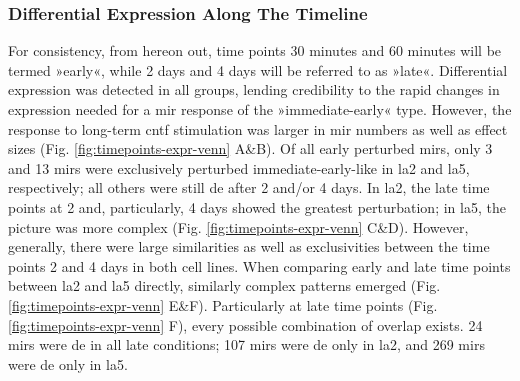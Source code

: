 \subsubsection{Differential Expression Along The Timeline}
For consistency, from hereon out, time points 30 minutes and 60 minutes will be termed »early«, while 2 days and 4 days will be referred to as »late«. Differential expression was detected in all groups, lending credibility to the rapid changes in expression needed for a \ac{mir} response of the »immediate-early« type. However, the response to long-term \ac{cntf} stimulation was larger in \ac{mir} numbers as well as effect sizes (Fig. \ref{fig:timepoints-expr-venn} A\&B). Of all early perturbed \acp{mir}, only 3 and 13 \acp{mir} were exclusively perturbed immediate-early-like in \ac{la2} and \ac{la5}, respectively; all others were still \ac{de} after 2 and/or 4 days. In \ac{la2}, the late time points at 2 and, particularly, 4 days showed the greatest perturbation; in \ac{la5}, the picture was more complex (Fig. \ref{fig:timepoints-expr-venn} C\&D). However, generally, there were large similarities as well as exclusivities between the time points 2 and 4 days in both cell lines. When comparing early and late time points between \ac{la2} and \ac{la5} directly, similarly complex patterns emerged (Fig. \ref{fig:timepoints-expr-venn} E\&F). Particularly at late time points (Fig. \ref{fig:timepoints-expr-venn} F), every possible combination of overlap exists. 24 \acp{mir} were \ac{de} in all late conditions; 107 \acp{mir} were \ac{de} only in \ac{la2}, and 269 \acp{mir} were \ac{de} only in \ac{la5}. 

